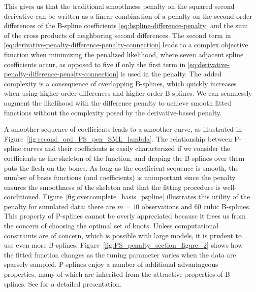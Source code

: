 This gives us that the traditional smoothness penalty on the squared second derivative can be written as a linear combination of a penalty on the second-order differences of the B-spline coefficients \ref{eq:bspline-difference-penalty} and the sum of the cross products of neighboring second differences. The second term in \ref{eq:derivative-penalty-difference-penalty-connection} leads to a complex objective function when minimizing the penalized likelihood, where seven adjacent spline coefficients occur, as opposed to five if only the first term in \ref{eq:derivative-penalty-difference-penalty-connection} is used in the penalty. The added complexity is a consequence of overlapping B-splines, which quickly increases when using higher order differences and higher order B-splines. We can seamlessly augment the likelihood with the difference penalty to achieve smooth fitted functions without the complexity posed by the derivative-based penalty.

A smoother sequence of coefficients leads to a smoother curve, as illustrated in Figure~\ref{fig:second_ord_PS_pen_SML_lambda}.  The relationship between P-spline curves and their coefficients is easily characterized if we consider the coefficients as the skeleton of the function, and draping the B-splines over them puts the flesh on the bones. As long as the coefficient sequence is smooth, the number of basis functions (and coefficients) is unimportant since the penalty ensures the smoothness of the skeleton and that the fitting procedure is well-conditioned. Figure~\ref{fig:overcomplete_basis_pspline} illustrates this utility of the penalty for simulated data; there are $m=10$ observations and $60$ cubic B-splines. This property of P-splines cannot be overly appreciated because it frees us from the concern of choosing the optimal set of knots. Unless computational constraints are of concern, which is possible with large models, it is prudent to use even more B-splines. Figure~\ref{fig:PS_penalty_section_figure_2} shows how the fitted function changes as the tuning parameter varies when the data are sparsely sampled. P-splines enjoy a number of additional advantageous properties, many of which are inherited from the attractive properties of B-splines. See \cite{eilers1996flexible}  for a detailed presentation. 

